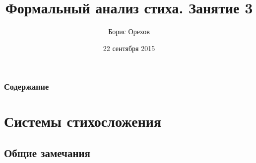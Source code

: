 \documentclass{beamer}
\title[Занятие 3]{Формальный анализ стиха. Занятие 3} %
\author{Борис Орехов} %
\institute[НИУ ВШЭ] %
{
НИУ Высшая школа экономики \\ %
\medskip
\textit{nevmenandr@gmail.com} %
}
\date{22 сентября 2015} %
\begin{document}
\begin{frame}
\titlepage %
\end{frame}



\begin{frame}
\frametitle{Содержание}  %
\tableofcontents %
\end{frame}




\section{Системы стихосложения}\label{sec:sys} %

\subsection{Общие замечания}\label{sec:subgen}

\end{document}
